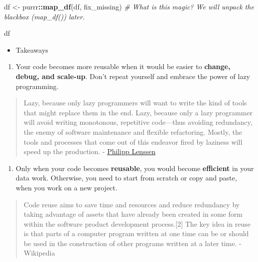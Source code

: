 \documentclass[
]{book}
\newenvironment{Shaded}{\begin{snugshade}}{\end{snugshade}}
\newcommand{\CommentTok}[1]{\textcolor[rgb]{0.56,0.35,0.01}{\textit{#1}}}
\newcommand{\KeywordTok}[1]{\textcolor[rgb]{0.13,0.29,0.53}{\textbf{#1}}}
\newcommand{\NormalTok}[1]{#1}
\newcommand{\OperatorTok}[1]{\textcolor[rgb]{0.81,0.36,0.00}{\textbf{#1}}}
\newcommand{\StringTok}[1]{\textcolor[rgb]{0.31,0.60,0.02}{#1}}
\providecommand{\tightlist}{%
  \setlength{\itemsep}{0pt}\setlength{\parskip}{0pt}}
\begin{document}
\begin{Shaded}
\begin{Highlighting}[]
\NormalTok{df \textless{}{-}}\StringTok{ }\NormalTok{purrr}\OperatorTok{::}\KeywordTok{map\_df}\NormalTok{(df, fix\_missing) }\CommentTok{\# What is this magic? We will unpack the blackbox (\textasciigrave{}map\_df()\textasciigrave{}) later.}

\NormalTok{df}
\end{Highlighting}
\end{Shaded}

\begin{itemize}
\tightlist
\item
  Takeaways
\end{itemize}

\begin{enumerate}
\def\labelenumi{\arabic{enumi}.}
\tightlist
\item
  Your code becomes more reusable when it would be easier to \textbf{change, debug, and scale-up}. Don't repeat yourself and embrace the power of lazy programming.
\end{enumerate}

\begin{quote}
Lazy, because only lazy programmers will want to write the kind of tools that might replace them in the end. Lazy, because only a lazy programmer will avoid writing monotonous, repetitive code---thus avoiding redundancy, the enemy of software maintenance and flexible refactoring. Mostly, the tools and processes that come out of this endeavor fired by laziness will speed up the production. - \href{http://blogoscoped.com/archive/2005-08-24-n14.html}{Philipp Lenssen}
\end{quote}

\begin{enumerate}
\def\labelenumi{\arabic{enumi}.}
\setcounter{enumi}{1}
\tightlist
\item
  Only when your code becomes \textbf{reusable}, you would become \textbf{efficient} in your data work. Otherwise, you need to start from scratch or copy and paste, when you work on a new project.
\end{enumerate}

\begin{quote}
Code reuse aims to save time and resources and reduce redundancy by taking advantage of assets that have already been created in some form within the software product development process.{[}2{]} The key idea in reuse is that parts of a computer program written at one time can be or should be used in the construction of other programs written at a later time. - Wikipedia
\end{quote}
\end{document}
